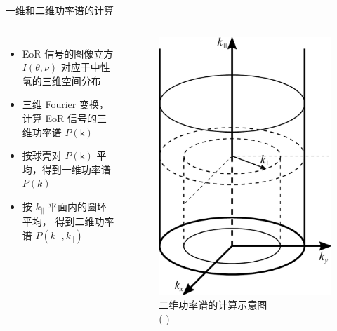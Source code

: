 \documentclass{beamer}
\newcommand{\B}[1]{\bm{\mathsf{#1}}}  %
\newcommand{\citeay}[1]{\citeauthor{#1} \citeyear{#1} \parencite{#1}}
\begin{document}
\begin{frame}{一维和二维功率谱的计算}
  \begin{columns}
    \begin{itemize}
      \item EoR 信号的\alert{图像立方} $I(\B{\theta}, \nu)$
        对应于中性氢的三维空间分布
      \item 三维 Fourier 变换，计算 EoR 信号的\alert{三维功率谱} $P(\B{k})$
      \item 按球壳对 $P(\B{k})$ 平均，得到\alert{一维功率谱} $P(k)$
      \item 按 $k_{\parallel}$ 平面内的圆环平均，
        得到\alert{二维功率谱} $P(k_{\perp}, k_{\parallel})$
    \end{itemize}

    \begin{figure}
      \centering
      \includegraphics[width=\columnwidth]{ps2d-annuli-diagram}
      \caption{二维功率谱的计算示意图\\(\citeay{thyagarajan2013})}
    \end{figure}
  \end{columns}
\end{frame}
\end{document}
